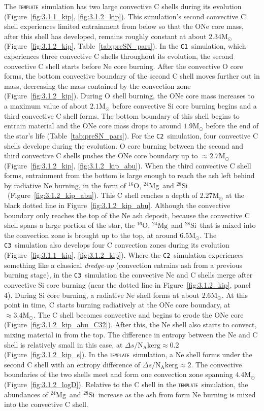 \documentclass[useAMS,usenatbib]{mn2e}
\newcommand{\Msun}{\ensuremath{\mathrm{M}_\odot}}
\newcommand{\template}{\textsc{\texttt{template}}}
\newcommand{\Ca}{\textsc{\texttt{C1}}}
\newcommand{\Cb}{\textsc{\texttt{C2}}}
\newcommand{\Cc}{\textsc{\texttt{C3}}}
\newcommand{\nuclei}[2]{\ensuremath{\mathrm{^{#1}#2}}}
\newcommand{\oxygen}[1][16]{\nuclei{#1}{O}}
\newcommand{\magnesium}[1][24]{\nuclei{#1}{Mg}}
\newcommand{\silicon}[1][28]{\nuclei{#1}{Si}}
\begin{document}
The \template\ simulation has two large convective C shells during its
evolution (Figure~\ref{fig:3.1.1_kip}, \ref{fig:3.1.2_kip}). This simulation's
second convective C shell experiences limited entrainment from below so that
the ONe core mass, after this shell has developed, remains roughly constant at
about $2.34\Msun$ (Figure~\ref{fig:3.1.2_kip}, Table~\ref{tab:preSN_pars}).  In
the \Ca\ simulation, which experiences three convective C shells throughout
its evolution, the second convective C shell starts before Ne core burning.
After the convective O core forms, the bottom convective boundary of the second
C shell moves further out in mass, decreasing the mass contained by the
convection zone (Figure~\ref{fig:3.1.2_kip}). During O shell burning, the ONe
core mass increases to a maximum value of about $2.1\Msun$ before convective Si
core burning begins and a third convective C shell forms. The bottom boundary
of this shell begins to entrain material and the ONe core mass drops to around
$1.9\Msun$ before the end of the star's life (Table~\ref{tab:preSN_pars}). For
the \Cb\ simulation, four convective C shells develope during the
evolution. O core burning between the second and third convective C shells
pushes the ONe core boundary up to $\approx 2.7 \Msun$
(Figure~\ref{fig:3.1.2_kip}, \ref{fig:3.1.2_kip_abu}). When the third
convective C shell forms, entrainment from the bottom is large enough to reach
the ash left behind by radiative Ne burning, in the form of \oxygen,
\magnesium\ and \silicon\ (Figure~\ref{fig:3.1.2_kip_abu}). This C shell
reaches a depth of $2.27\Msun$ at the black dotted line in
Figure~\ref{fig:3.1.2_kip_abu}.  Although the convective boundary only reaches
the top of the Ne ash deposit, because the convective C shell spans a large
portion of the star, the \oxygen, \magnesium\ and \silicon\ that is mixed
into the convection zone is brought up to the top, at around $6.5\Msun$. The
\Cc\ simulation also develops four C convection zones during its evolution
(Figure~\ref{fig:3.1.1_kip}, \ref{fig:3.1.2_kip}). Where the \Cb\ simulation
experiences something like a classical \textit{dredge-up} (convection entrains
ash from a previous burning stage), in the \Cc\ simulation the convective Ne
and C shells merge after convective Si core burning (near the dotted line in
Figure~\ref{fig:3.1.2_kip}, panel 4). During Si core burning, a radiative Ne
shell forms at about $2.6\Msun$. At this point in time, C starts burning
radiatively at the ONe core boundary, at $\approx3.4\Msun$.  The
C shell becomes convective and begins to erode the ONe core
(Figure~\ref{fig:3.1.2_kip_abu_C32}). After this, the Ne shell also starts to
convect, mixing material in from the top. The difference in entropy between the
Ne and C shell is relatively small in this case, at $\Delta s/\mathrm{N_A kerg}
\approx 0.2$ (Figure~\ref{fig:3.1.2_kip_s}). In the \template\ simulation, 
a Ne shell forms
under the second C shell with an entropy difference of $\Delta s/\mathrm{N_A
kerg} \approx 2$. The
convective boundaries of the two shells meet and form one convection zone
spanning $4.4\Msun$ (Figure~\ref{fig:3.1.2_logD}). Relative to the C shell in
the \template\ simulation, the abundances of \magnesium\ and \silicon\
increase as the ash from form Ne burning is mixed into the convective C shell.
\end{document}
